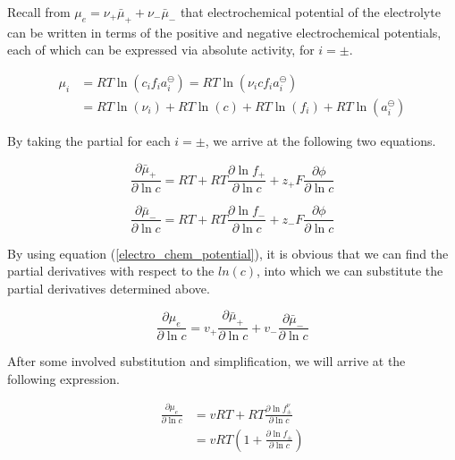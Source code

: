 \documentclass[lettersize,journal]{IEEEtran}
\begin{document}
\noindent Recall from $ \mu_{e}=\nu_{+} \bar{\mu}_{+}+\nu_{-} \bar{\mu}_{-}$ that electrochemical potential of the electrolyte can be written in terms of the positive and negative electrochemical potentials, each of which can be expressed via absolute activity, for $i = \pm$.

\begin{equation}
\begin{aligned}
\mu_{i} &=R T \ln \left(c_{i} f_{i} a_{i}^{\ominus}\right)=R T \ln \left(\nu_{i} c f_{i} a_{i}^{\ominus}\right) \\
&=R T \ln \left(\nu_{i}\right)+R T \ln (c)+R T \ln \left(f_{i}\right)+R T \ln \left(a_{i}^{\ominus}\right)
\end{aligned}
\end{equation}

\noindent By taking the partial for each $i = \pm$, we arrive at the following two equations.

\begin{equation}
\frac{\partial \bar{\mu}_{+}}{\partial \ln c}=R T+R T \frac{\partial \ln f_{+}}{\partial \ln c}+z_{+} F \frac{\partial \phi}{\partial \ln c}
\end{equation}

\begin{equation}
\frac{\partial \bar{\mu}_{-}}{\partial \ln c}=R T+R T \frac{\partial \ln f_{-}}{\partial \ln c}+z_{-} F \frac{\partial \phi}{\partial \ln c}
\end{equation}


\noindent By using equation (\ref{electro_chem_potential}), it is obvious that we can find the partial derivatives with respect to the $ln(c)$, into which we can substitute the partial derivatives determined above.

\begin{equation}
\frac{\partial \mu_{e}}{\partial \ln c} =v_{+} \frac{\partial \bar{\mu}_{+}}{\partial \ln c}+v_{-} \frac{\partial \bar{\mu}_{-}}{\partial \ln c}
\end{equation}

\noindent After some involved substitution and simplification, we will arrive at the following expression.

\begin{equation}
\begin{aligned}
\frac{\partial \mu_{e}}{\partial \ln c} &=v R T+R T \frac{\partial \ln f_{\pm}^{\nu}}{\partial \ln c} \\
&=v R T\left(1+\frac{\partial \ln f_{\pm}}{\partial \ln c}\right)
\end{aligned}
\end{equation}
\end{document}
